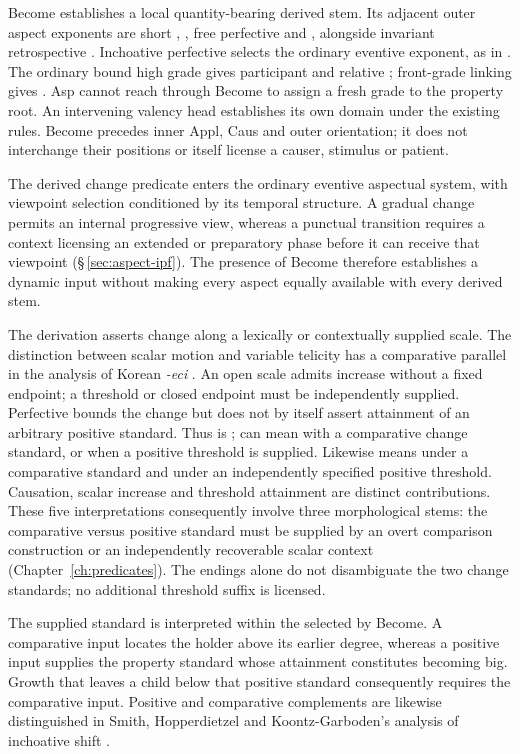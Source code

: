 Become establishes a local quantity-bearing derived stem. Its adjacent outer
aspect exponents are short , , free perfective
 and , alongside invariant retrospective .
Inchoative perfective selects the
ordinary eventive exponent, as in .
The ordinary bound high grade gives participant  and
relative ; front-grade linking gives .
Asp cannot reach through Become to assign a fresh grade to the property root.
An intervening valency head establishes its own domain under the existing
rules. Become precedes inner Appl, Caus and outer orientation; it does not
interchange their positions or itself license a causer, stimulus or patient.

The derived change predicate enters the ordinary eventive aspectual system,
with viewpoint selection conditioned by its temporal structure. A gradual
change permits an internal progressive view, whereas a punctual transition
requires a context licensing an extended or preparatory phase before it can
receive that viewpoint (§\,\ref{sec:aspect-ipf}). The presence of Become
therefore establishes a dynamic input without making every aspect equally
available with every derived stem.

The derivation asserts change along a lexically or contextually supplied
scale. The distinction between scalar motion and variable telicity has a
comparative parallel in the analysis of Korean \textit{-eci}
\cite{limzubizarreta2012}. An open scale admits increase without a fixed endpoint; a threshold or
closed endpoint must be independently supplied. Perfective bounds the change
but does not by itself assert attainment of an arbitrary positive standard.
Thus  is ;  can mean
 with a comparative change standard, or
 when a positive threshold is supplied. Likewise
 means  under a comparative standard and
 under an independently specified positive threshold.
Causation, scalar increase and threshold attainment are distinct contributions.
These five interpretations consequently involve three morphological stems:
the comparative versus positive standard must be supplied by an overt
comparison construction or an independently recoverable scalar context
(Chapter~\ref{ch:predicates}). The endings alone do not disambiguate the two
change standards; no additional threshold suffix is licensed.

The supplied standard is interpreted within the  selected
by Become. A comparative input locates the holder above its earlier degree,
whereas a positive input supplies the property standard whose attainment
constitutes becoming big. Growth that leaves a child below that positive
standard consequently requires the comparative input. Positive and
comparative complements are likewise distinguished in Smith, Hopperdietzel
and Koontz-Garboden's analysis of inchoative shift
\cite[§5.1]{smithhopperdietzelkoontzgarboden2025}.


